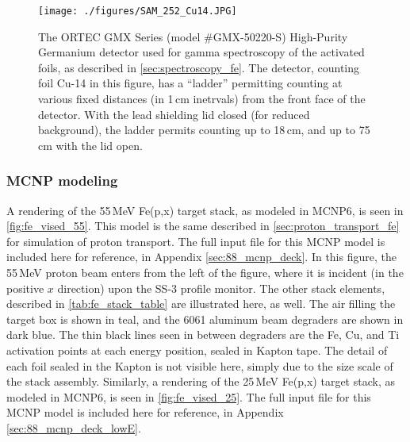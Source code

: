 \begin{figure}
 \centering
 \texttt{[image: ./figures/SAM\_252\_Cu14.JPG]}
 \caption{The ORTEC GMX Series (model \#GMX-50220-S)  High-Purity Germanium detector used for gamma spectroscopy of the activated foils, as described in \autoref{sec:spectroscopy_fe}. The detector, counting foil Cu-14 in this figure, has a \enquote{ladder} permitting counting at various fixed distances (in 1\,cm inetrvals) from the front face of the detector. With the lead shielding lid closed (for reduced background), the ladder permits counting up to 18\,cm, and up to 75\,cm with the lid open.   }
 \label{fig:fe_IMG_1984}
\end{figure}



\subsubsection{MCNP modeling}



A rendering of the 55\,MeV Fe(p,x) target stack, as modeled in MCNP6, is seen in \autoref{fig:fe_vised_55}.
This model is the same described in \autoref{sec:proton_transport_fe} for simulation of proton transport.
The full input file for this MCNP model is included here for reference, in Appendix \ref{sec:88_mcnp_deck}.
In this figure, the 55\,MeV proton beam enters from the left of the figure, where it is incident (in the positive $x$ direction) upon the SS-3 profile monitor.
The other stack elements, described in  \autoref{tab:fe_stack_table} are illustrated here, as well.
The air filling the target box is shown in teal, and the 6061 aluminum beam degraders are shown in dark blue.  
The thin black lines seen in between degraders are the Fe, Cu, and Ti activation points at each energy position, sealed in Kapton tape. 
The detail of each foil sealed in the Kapton is not visible here, simply due to the size scale of the stack assembly.
Similarly, a rendering of the 25\,MeV Fe(p,x) target stack, as modeled in MCNP6, is seen in \autoref{fig:fe_vised_25}.
The full input file for this MCNP model is included here for reference, in Appendix \ref{sec:88_mcnp_deck_lowE}.




